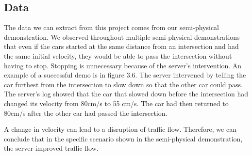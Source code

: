 \subsection{Data}
The data we can extract from this project comes from our semi-physical demonstration. We observed throughout multiple semi-physical demonstrations that even if the cars started at the same distance from an intersection and had the same initial velocity, they would be able to pass the intersection without having to stop. Stopping is unnecessary because of the server's intervention. An example of a successful demo is in figure 3.6. The server intervened by telling the car furthest from the intersection to slow down so that the other car could pass. The server's log showed that the car that slowed down before the intersection had changed its velocity from 80cm/s to 55 cm/s. The car had then returned to 80cm/s after the other car had passed the intersection.

A change in velocity can lead to a disruption of traffic flow. Therefore, we can conclude that in the specific scenario shown in the semi-physical demonstration, the server improved traffic flow.